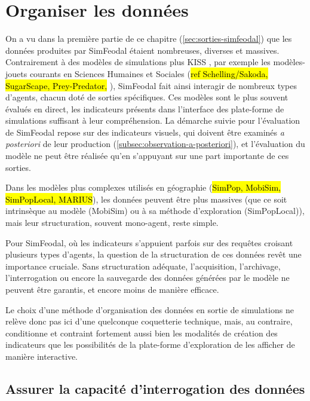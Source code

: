 \clearpage
\section{Organiser les données}\label{sec:organiser-donnees}

On a vu dans la première partie de ce chapitre (\cref{sec:sorties-simfeodal}) que les données produites par SimFeodal étaient nombreuses, diverses et massives.
Contrairement à des modèles de simulations plus \og KISS \fg{}, par exemple les \og modèles-jouets\fg{} courants en Sciences Humaines et Sociales (\hl{ref Schelling/Sakoda, SugarScape, Prey-Predator, }), SimFeodal fait ainsi interagir de nombreux types d'agents, chacun doté de sorties spécifiques. Ces modèles sont le plus souvent évalués \og en direct\fg{}, les indicateurs présents dans l'interface des plate-forme de simulations suffisant à leur compréhension.
La démarche suivie pour l'évaluation de SimFeodal repose sur des indicateurs visuels, qui doivent être examinés \textit{a posteriori} de leur production (\cref{subsec:observation-a-posteriori}), et l'évaluation du modèle ne peut être réalisée qu'en s'appuyant sur une part importante de ces sorties.

Dans les modèles plus complexes utilisés en géographie (\hl{SimPop, MobiSim, SimPopLocal, MARIUS}), les données peuvent être plus massives (que ce soit intrinsèque au modèle (MobiSim) ou à sa méthode d'exploration (SimPopLocal)), mais leur structuration, souvent mono-agent, reste simple.

Pour SimFeodal, où les indicateurs s'appuient parfois sur des requêtes croisant plusieurs types d'agents, la question de la structuration de ces données revêt une importance cruciale.
Sans structuration adéquate, l'acquisition, l'archivage, l'interrogation ou encore la sauvegarde des données générées par le modèle ne peuvent être garantis, et encore moins de manière efficace.

Le choix d'une méthode d'organisation des données en sortie de simulations ne relève donc pas ici d'une quelconque coquetterie technique, mais, au contraire, conditionne et contraint fortement aussi bien les modalités de création des indicateurs que les possibilités de la plate-forme d'exploration de les afficher de manière interactive.

	\subsection{Assurer la capacité d'interrogation des données}\label{subsec:capacite-interrogation}

